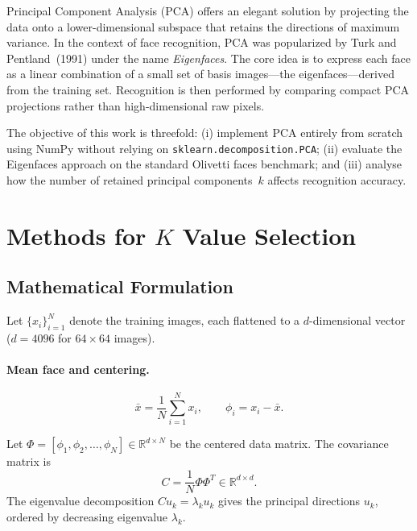 \documentclass[a4paper,fleqn]{cas-sc}
\begin{document}
Principal Component Analysis (PCA) offers an elegant solution by projecting the data onto a lower-dimensional subspace that retains the directions of maximum variance. In the context of face recognition, PCA was popularized by Turk and Pentland~(1991) under the name \textit{Eigenfaces}. The core idea is to express each face as a linear combination of a small set of basis images---the eigenfaces---derived from the training set. Recognition is then performed by comparing compact PCA projections rather than high-dimensional raw pixels.

The objective of this work is threefold: (i) implement PCA entirely from scratch using NumPy without relying on \texttt{sklearn.decomposition.PCA}; (ii) evaluate the Eigenfaces approach on the standard Olivetti faces benchmark; and (iii) analyse how the number of retained principal components~$k$ affects recognition accuracy.

\section{Methods for $K$ Value Selection}

\subsection{Mathematical Formulation}

Let $\{x_i\}_{i=1}^{N}$ denote the training images, each flattened to a $d$-dimensional vector ($d = 4096$ for $64\times64$ images).

\paragraph{Mean face and centering.}
\begin{equation}
    \bar{x} = \frac{1}{N}\sum_{i=1}^{N} x_i, \qquad \phi_i = x_i - \bar{x}.
\end{equation}

Let $\Phi = [\phi_1, \phi_2, \ldots, \phi_N] \in \mathbb{R}^{d \times N}$ be the centered data matrix. The covariance matrix is
\begin{equation}
    C = \frac{1}{N}\Phi\Phi^T \in \mathbb{R}^{d \times d}.
\end{equation}
The eigenvalue decomposition $C u_k = \lambda_k u_k$ gives the principal directions $u_k$, ordered by decreasing eigenvalue $\lambda_k$.
\end{document}
